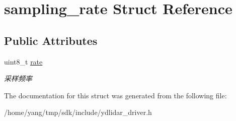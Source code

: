 \hypertarget{structsampling__rate}{}\section{sampling\+\_\+rate Struct Reference}
\label{structsampling__rate}
\subsection*{Public Attributes}
\begin{DoxyCompactItemize}
\item 
uint8\+\_\+t \hyperlink{structsampling__rate_a8d860fbedd930d2022fe7bb6cf1f78b6}{rate}\hypertarget{structsampling__rate_a8d860fbedd930d2022fe7bb6cf1f78b6}{}\label{structsampling__rate_a8d860fbedd930d2022fe7bb6cf1f78b6}

\begin{DoxyCompactList}\small\item\em 采样频率 \end{DoxyCompactList}\end{DoxyCompactItemize}


The documentation for this struct was generated from the following file\+:\begin{DoxyCompactItemize}
\item 
/home/yang/tmp/sdk/include/ydlidar\+\_\+driver.\+h\end{DoxyCompactItemize}
